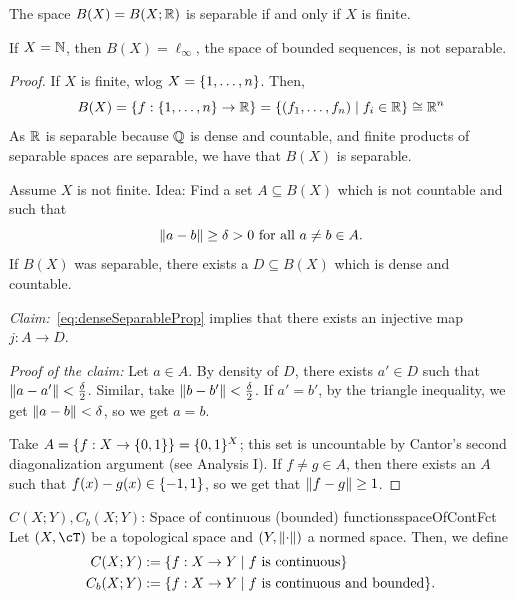 \documentclass[language=english]{../../Template/TemplateLecture}
\begin{document}

\begin{prop}\label{prop:BxSeparableIffXfinite}
    The space $B(X) = B(X; \mathbb{R})$ is separable if and only if $X$ is finite.
\end{prop}

\begin{beispiel}
    If $X = \mathbb{N}$, then $B(X) = \ell_\infty$, the space of bounded sequences, is not separable.
\end{beispiel}

\begin{proof}
    If $X$ is finite, wlog $X = \{1,\ldots,n\}$. Then,
    \begin{equation}
        B(X) = \{f: \{1,\ldots,n\} \to \mathbb{R}\} = \{(f_1,\ldots,f_n) \mid f_i \in \mathbb{R}\} \cong \mathbb{R}^n
    \end{equation}
    As $\mathbb{R}$ is separable because $\mathbb{Q}$ is dense and countable, and finite products of separable spaces are separable, we have that $B(X)$ is separable.

    Assume $X$ is not finite. Idea: Find a set $A \subseteq B(X)$ which is not countable and such that
    \begin{equation}
        \lVert a - b\rVert \geq \delta > 0 \text{ for all } a \neq b \in A. \label{eq:denseSeparableProp}
    \end{equation}
    If $B(X)$ was separable, there exists a $D \subseteq B(X)$ which is dense and countable.
    
    \emph{Claim:}~\eqref{eq:denseSeparableProp} implies that there exists an injective map $j: A \to D$.

    \emph{Proof of the claim:} Let $a \in A$. By density of $D$, there exists $a' \in D$ such that $\lVert a - a'\rVert < \frac{\delta}{2}$. Similar, take $\lVert b - b'\rVert < \frac{\delta}{2}$. If $a' = b'$, by the triangle inequality, we get $\lVert a - b\rVert < \delta$, so we get $a = b$.

    Take $A = \{f: X \to \{0,1\}\} = \{0,1\}^X$; this set is uncountable by Cantor's second diagonalization argument (see Analysis I). If $f \neq g \in A$, then there exists an $A$ such that $f(x) - g(x) \in \{-1,1\}$, so we get that $\lVert f - g\rVert \geq 1$.
\end{proof}

\begin{defi}{$C(X;Y), C_b(X;Y)$: Space of continuous (bounded) functions}{spaceOfContFct}
    Let $(X, \cT)$ be a topological space and $(Y, \lVert\cdot\rVert)$ a normed space. Then, we define
    \begin{equation}
        \begin{split}
            C(X;Y) &:= \{f: X \to Y \mid \text{$f$ is continuous}\} \\
            C_b(X;Y) &:= \{f: X \to Y \mid \text{$f$ is continuous and bounded}\}.
        \end{split}
    \end{equation}
\end{defi}
\end{document}
